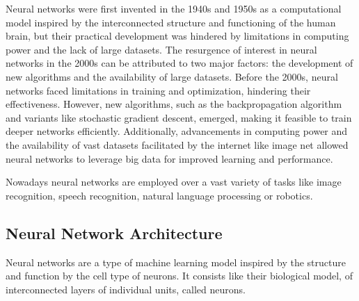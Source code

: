 Neural networks were first invented in the 1940s and 1950s as a computational model inspired by the interconnected structure and functioning of the human brain, but their practical development was hindered by limitations in computing power and the lack of large datasets. 
The resurgence of interest in neural networks in the 2000s can be attributed to two major factors: the development of new algorithms and the availability of large datasets. Before the 2000s, neural networks faced limitations in training and optimization, hindering their effectiveness. However, new algorithms, such as the backpropagation algorithm and variants like stochastic gradient descent, emerged, making it feasible to train deeper networks efficiently. Additionally, advancements in computing power and the availability of vast datasets facilitated by the internet like image net  allowed neural networks to leverage big data for improved learning and performance.

Nowadays neural networks are employed over a vast variety of tasks like image recognition, speech recognition, natural language processing or robotics. 

\subsection{Neural Network Architecture}


Neural networks are a type of machine learning model inspired by the structure and function by the cell type of neurons. It consists like their biological model, of interconnected layers of individual units, called neurons.

